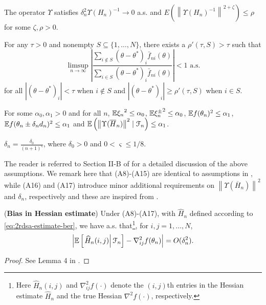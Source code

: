 \begin{pvn}
\item The operator $\Upsilon$ satisfies $\delta_n^2 \Upsilon(H_n)^{-1} \rightarrow 0$ a.s. and  $E(\left\| \Upsilon(H_n)^{-1}\right\|^{2+\zeta}) \le \rho$ for some $\zeta, \rho>0$.

\item For any $\tau >0$ and nonempty $S \subseteq \{1,\ldots,N\}$, there exists a $\rho'(\tau,S)>\tau$ such that 
$$ \limsup_{n\rightarrow \infty} \left| \dfrac{\sum_{i \notin S} (\theta-\theta^*)_i \bar f_{ni}(\theta)}{\sum_{i \in S} (\theta-\theta^*)_i \bar f_{ni}(\theta)}               \right| < 1 \text{ a.s.}$$
for all $|(\theta-\theta^*)_i| < \tau$ when $i \notin S$ and $|(\theta-\theta^*)_i| \ge \rho'(\tau,S)$ when $i\in S$.
\item For some $\alpha_0, \alpha_1>0$ and for all $n$, $\mathbb{E} {\xi_n}^{2} \le \alpha_0$, $\mathbb{E} {\xi_n^{\pm}}^{2} \le \alpha_0$, $\mathbb{E} f(\theta_n)^{2} \le \alpha_1$,  $\mathbb{E} f(\theta_n\pm \delta_n d_n)^{2} \le \alpha_1$ and $\mathbb{E} \left(\left\| \Upsilon(\overline H_n) \right\|^2 \mid \mathcal{F}_n\right) \le \alpha_1$. 
\item  $\delta_n = \frac{\delta_0}{(n+1)^{\varsigma}}$, where $\delta_0 > 0$ and $0 < \varsigma \le 1/8$.
\end{pvn}
The reader is referred to Section II-B of \cite{prashanth2015rdsa} for a detailed discussion of the above assumptions. We remark here that (A8)-(A15) are identical to assumptions in \cite{prashanth2015rdsa}, while (A16) and (A17) introduce minor additional requirements on $\left\| \Upsilon(\overline H_n )\right\|^2$ and $\delta_n$, respectively and these are inspired from \cite{spall-jacobian}.

\begin{lemma}(\textbf{Bias in Hessian estimate})
\label{lemma:2rdsa-bias}
Under (A8)-(A17), with $\widehat H_n$ defined according to \eqref{eq:2rdsa-estimate-ber}, we have a.s. that\footnote{Here $\widehat H_n(i,j)$ and $\nabla^2_{ij}f(\cdot)$ denote the $(i,j)$th entries in the Hessian estimate $\widehat H_n$ and the true Hessian $\nabla^2 f(\cdot)$, respectively.}, for $i,j = 1,\ldots,N$,
\begin{align}
\left|\mathbb{E}\left[
\left. \widehat H_n(i,j) \right| \mathcal{F}_n \right] - \nabla^2_{ij} f(\theta_n)\right| = O(\delta_n^2).
\end{align} 
\end{lemma}
\begin{proof}
See Lemma 4 in \cite{prashanth2015rdsa}.
\end{proof}

